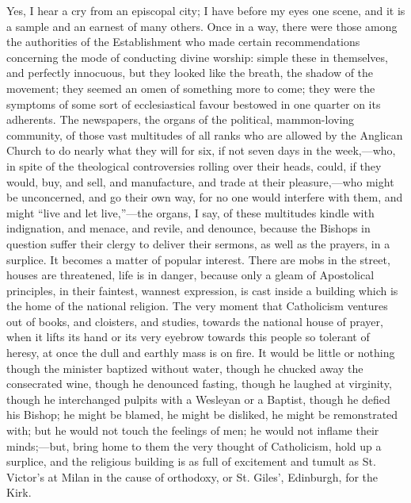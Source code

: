Yes, I hear a cry from an episcopal city; I have before my eyes one
scene, and it is a sample and an earnest of many others. Once in a
way, there were those among the authorities of the Establishment who
made certain recommendations concerning the mode of conducting divine
worship: simple these in themselves, and perfectly innocuous, but they
looked like the breath, the shadow of the movement; they seemed an
omen of something more to come; they were the symptoms of some sort of
ecclesiastical favour bestowed in one quarter on its adherents. The
newspapers, the organs of the political, mammon-loving community, of
those vast multitudes of all ranks who are allowed by the Anglican
Church to do nearly what they will for six, if not seven days in the
week,—who, in spite of the theological controversies rolling over
their heads, could, if they would, buy, and sell, and manufacture, and
trade at their pleasure,—who might be unconcerned, and go their own
way, for no one would interfere with them, and might ``live and
let live,''—the organs, I say, of these multitudes kindle with
indignation, and menace, and revile, and denounce, because the Bishops
in question suffer their clergy to deliver their sermons, as well as
the prayers, in a surplice. It becomes a matter of popular interest.
There are mobs in the street, houses are threatened, life is in
danger, because only a gleam of Apostolical principles, in their
faintest, wannest expression, is cast inside a building which is the
home of the national religion. The very moment that Catholicism
ventures out of books, and cloisters, and studies, towards the
national house of prayer, when it lifts its hand or its very eyebrow
towards this people so tolerant of heresy, at once the dull and
earthly mass is on fire. It would be little or nothing though the
minister baptized without water, though he chucked away the
consecrated wine, though he denounced fasting, though he laughed at
virginity, though he interchanged pulpits with a Wesleyan or a
Baptist, though he defied his Bishop; he might be blamed, he might be
disliked, he might be remonstrated with; but he would not touch the
feelings of men; he would not inflame their minds;—but, bring home
to them the very thought of Catholicism, hold up a surplice, and the
religious building is as full of excitement and tumult as St. Victor's
at Milan in the cause of orthodoxy, or St. Giles', Edinburgh, for the
Kirk.

